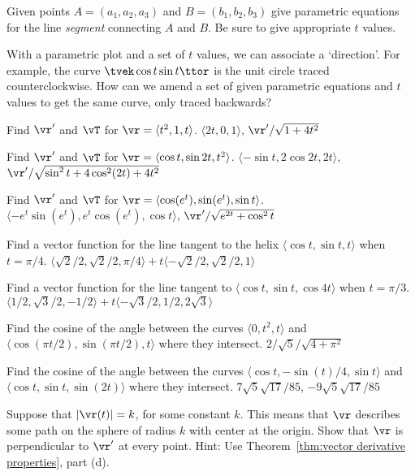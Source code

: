 \begin{multicols}{2}
\problem Given points $A=(a_1, a_2, a_3)$ and $B=(b_1, b_2, b_3)$ give %
parametric equations for the line {\em segment} connecting $A$ and
$B$. Be sure to give appropriate $t$ values.

\problem With a parametric plot and a set of $t$ values, we can associate %
a `direction'.  For example, the curve $\tvek \cos t\\ \sin t
\ttor$ is the unit circle traced counterclockwise.  How can we amend
a set of given parametric equations and $t$ values to get the same
curve, only traced backwards?




\problem Find $\vr '$ and $\vT$ for %
$\vr  = \langle t^2,1,t\rangle$.
\answer
$\langle 2t,0,1\rangle$, $\vr '/\sqrt{1+4t^2}$
\endanswer

\problem Find $\vr '$ and $\vT$ for %
$\vr  = \langle \cos t, \sin 2t, t^2\rangle$.
\answer
$\langle -\sin t, 2\cos 2t,2t\rangle$,
$\vr '/\sqrt{\sin^2t + 4\cos^2(2t)+4t^2}$
\endanswer

\problem Find $\vr '$ and $\vT$ for %
$\vr  = \langle \cos(e^t),\sin(e^t),\sin t\rangle$.
\answer
$\langle -e^t\sin(e^t),e^t\cos(e^t),\cos t\rangle$,
$\vr '/\sqrt{e^{2t}+\cos^2 t}$
\endanswer

\problem Find a vector function for the line tangent to the helix %
$\langle \cos t,\sin t, t\rangle$ when $t=\pi/4$.
\answer
$\langle \sqrt2/2,\sqrt2/2,\pi/4\rangle+
t\langle -\sqrt2/2,\sqrt2/2,1\rangle$
\endanswer

\problem Find a vector function for the line tangent to  %
$\langle \cos t,\sin t, \cos 4t \rangle$ when $t=\pi/3$.
\answer
$\langle 1/2,\sqrt3/2,-1/2\rangle+
t\langle -\sqrt3/2,1/2,2\sqrt3\rangle$
\endanswer

\problem Find the cosine of the angle between the curves $\langle %
0,t^2,t\rangle$ and $\langle \cos(\pi t/2),\sin(\pi t/2), t\rangle$
where they intersect.
\answer
$2/\sqrt5/\sqrt{4+\pi^2}$
\endanswer

\problem Find the cosine of the angle between the curves $\langle %
\cos t,-\sin(t)/4,\sin t\rangle$ and $\langle \cos t,\sin t, \sin(2t)\rangle$
where they intersect.
\answer
$7\sqrt{5}\sqrt{17}/85$, $-9\sqrt{5}\sqrt{17}/85$
\endanswer

\problem Suppose that $|\vr (t)|=k$, for some constant $k$. This %
means that $\vr$ describes some path on the sphere of radius $k$
with center at the origin. Show that $\vr$ is perpendicular to ${\vr}'$ at every
point. Hint: Use Theorem~\ref{thm:vector derivative
properties}, part (d).
\label{exercise:derivative is perpendicular}


\end{multicols}
